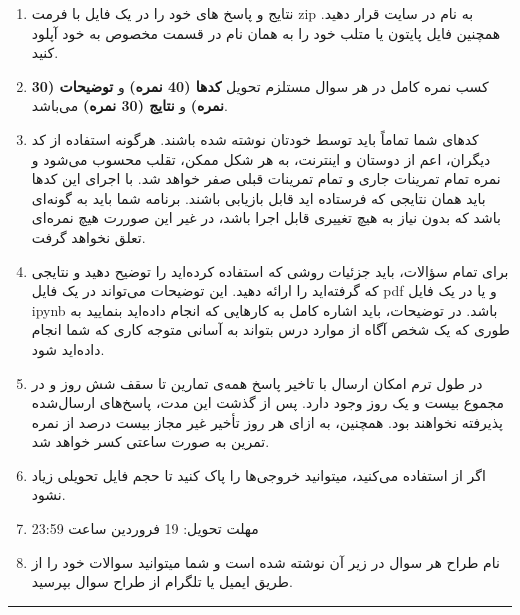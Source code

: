 \documentclass[a4paper]{article}
\begin{document}
\begin{enumerate}
	\item 
نتایج و پاسخ های خود را در یک فایل با فرمت zip به نام
 در سایت  
\href{https://quera.org/course/add_to_course/course/10598/}{} 
 قرار دهید. همچنین فایل پایتون یا متلب خود را به همان نام در قسمت مخصوص به خود آپلود کنید.
\item 
کسب نمره کامل در هر سوال مستلزم تحویل  
\textbf{کدها (40 نمره)}
 و
\textbf{توضیحات (30 نمره)}
و
\textbf{نتایج (30 نمره)}
 می‌باشد. 
\item 
کدهای شما تماماً باید توسط خودتان نوشته شده باشند. هرگونه استفاده از کد دیگران، اعم از دوستان و اینترنت، به هر شکل ممکن، تقلب محسوب می‌شود و نمره تمام تمرینات جاری و تمام تمرینات قبلی صفر خواهد شد. با اجرای این کدها باید همان نتایجی که فرستاده اید قابل بازیابی باشند. برنامه شما باید به گونه‌ای باشد که بدون نیاز به هیچ تغییری قابل اجرا باشد، در غیر این‌ صوررت هیچ نمره‌ای تعلق نخواهد گرفت. 
\item 
برای تمام سؤالات، باید جزئیات روشی که استفاده کرده‌اید را توضیح دهید و نتایجی که گرفته‌اید را ارائه دهید. این توضیحات می‌تواند در یک فایل  pdf  و یا در یک فایل  ipynb باشد. در توضیحات، باید اشاره کامل به کارهایی که انجام داده‌اید بنمایید به طوری که یک شخص آگاه از موارد درس بتواند به آسانی متوجه کاری که شما انجام داده‌اید شود.
\item 
در طول ترم امکان ارسال با تاخیر پاسخ  همه‌ی تمارین تا سقف شش روز و در مجموع بیست و یک روز وجود دارد. پس از گذشت این مدت، پاسخ‌های ارسال‌شده پذیرفته نخواهند بود. همچنین، به ازای هر روز تأخیر غیر مجاز  بیست درصد از نمره تمرین به صورت ساعتی کسر خواهد شد.
\item 
 اگر از
 استفاده می‌کنید، میتوانید خروجی‌ها‌ را پاک کنید تا حجم فایل تحویلی زیاد نشود.
\item 
مهلت تحویل: 19 فروردین ساعت 23:59 
\item 
نام طراح هر سوال در زیر آن نوشته شده است و شما میتوانید سوالات خود را از طریق ایمیل یا تلگرام از طراح سوال بپرسید.

\end{enumerate}
\rule[0.1\baselineskip]{\textwidth}{1pt}

\clearpage
\end{document}
